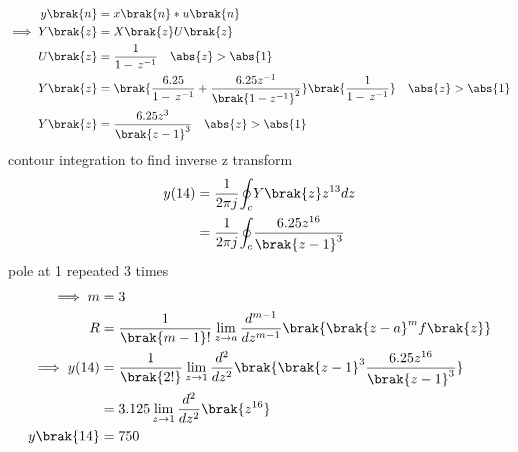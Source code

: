 \documentclass[journal,12pt,twocolumn]{IEEEtran}
\theoremstyle{remark}
\begin{document}
\begin{align}
y\brak{n}&=x\brak{n}*u\brak{n}\\
\implies Y\brak{z}&=X\brak{z}U\brak{z}\\
U\brak{z}&=\frac{1}{1-\,z^{-1}}\quad\abs{z}>\abs{1}\\
Y\brak{z}&=\brak{\frac{6.25}{1-\,z^{-1}}+\frac{6.25z^{-1}}{\brak{1-{z^{-1}}}^2}}\brak{\frac{1}{1-\,z^{-1}}}\quad\abs{z}>\abs{1}\\
Y\brak{z}&=\frac{6.25z^3}{\brak{z-1}^{3}} \quad\abs{z}>\abs{1}
\end{align}
  contour integration to find inverse z transform
\begin{align}
y(14)&=\frac{1}{2{\pi}j}{\oint_c}Y\brak{z}z^{13}dz\\
&=\frac{1}{2{\pi}j}{\oint_c}{\frac{6.25z^{16}}{\brak{z-1}^{3}}}
\end{align}
pole at 1 repeated 3 times\\
\begin{align}
\implies m&=3\\
R&=\frac{1}{\brak{m-1}!}\lim_{z\to a}\frac{d^{m-1}}{dz^{m-1}}\brak{\brak{z-a}^mf{\brak{z}}}\\
\implies y(14)&=\frac{1}{\brak{2!}}\lim_{z\to 1}\frac{d^2}{dz^2}\brak{\brak{z-1}^{3}\frac{6.25z^{16}}{\brak{z-1}^3}}\\
&=3.125\lim_{z\to1}\frac{d^2}{dz^2}\brak{z^{16}}\\
y\brak{14}&=750
\end{align}
\end{document}
